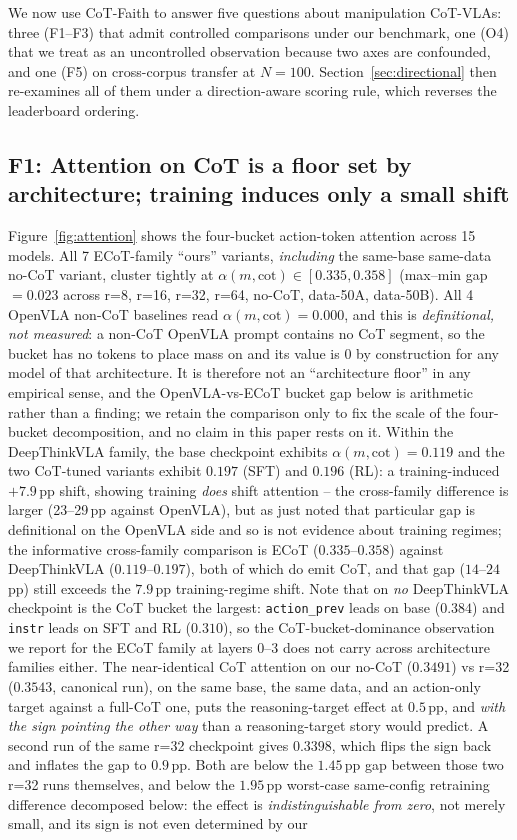 \documentclass{article}
\begin{document}
We now use CoT-Faith to answer five questions about manipulation CoT-VLAs: three (F1--F3) that admit controlled comparisons under our benchmark, one (O4) that we treat as an uncontrolled observation because two axes are confounded, and one (F5) on cross-corpus transfer at $N{=}100$. Section~\ref{sec:directional} then re-examines all of them under a direction-aware scoring rule, which reverses the leaderboard ordering.

\subsection{F1: Attention on CoT is a floor set by architecture; training induces only a small shift}

Figure~\ref{fig:attention} shows the four-bucket action-token attention across 15 models. All 7 ECoT-family ``ours'' variants, \emph{including} the same-base same-data no-CoT variant, cluster tightly at $\alpha(m, \text{cot}) \in [0.335, 0.358]$ (max--min gap $= 0.023$ across r=8, r=16, r=32, r=64, no-CoT, data-50A, data-50B). All 4 OpenVLA non-CoT baselines read $\alpha(m, \text{cot}) = 0.000$, and this is \emph{definitional, not measured}: a non-CoT OpenVLA prompt contains no CoT segment, so the bucket has no tokens to place mass on and its value is $0$ by construction for any model of that architecture. It is therefore not an ``architecture floor'' in any empirical sense, and the OpenVLA-vs-ECoT bucket gap below is arithmetic rather than a finding; we retain the comparison only to fix the scale of the four-bucket decomposition, and no claim in this paper rests on it. Within the DeepThinkVLA family, the base checkpoint exhibits $\alpha(m, \text{cot}) = 0.119$ and the two CoT-tuned variants exhibit $0.197$ (SFT) and $0.196$ (RL): a training-induced $+7.9$\,pp shift, showing training \emph{does} shift attention -- the cross-family difference is larger (23--29\,pp against OpenVLA), but as just noted that particular gap is definitional on the OpenVLA side and so is not evidence about training regimes; the informative cross-family comparison is ECoT ($0.335$--$0.358$) against DeepThinkVLA ($0.119$--$0.197$), both of which do emit CoT, and that gap ($14$--$24$\,pp) still exceeds the $7.9$\,pp training-regime shift. Note that on \emph{no} DeepThinkVLA checkpoint is the CoT bucket the largest: \texttt{action\_prev} leads on base ($0.384$) and \texttt{instr} leads on SFT and RL ($0.310$), so the CoT-bucket-dominance observation we report for the ECoT family at layers $0$--$3$ does not carry across architecture families either. The near-identical CoT attention on our no-CoT ($0.3491$) vs r=32 ($0.3543$, canonical run), on the same base, the same data, and an action-only target against a full-CoT one, puts the reasoning-target effect at $0.5$\,pp, and \emph{with the sign pointing the other way} than a reasoning-target story would predict. A second run of the same r=32 checkpoint gives $0.3398$, which flips the sign back and inflates the gap to $0.9$\,pp. Both are below the $1.45$\,pp gap between those two r=32 runs themselves, and below the $1.95$\,pp worst-case same-config retraining difference decomposed below: the effect is \emph{indistinguishable from zero}, not merely small, and its sign is not even determined by our 
\end{document}
